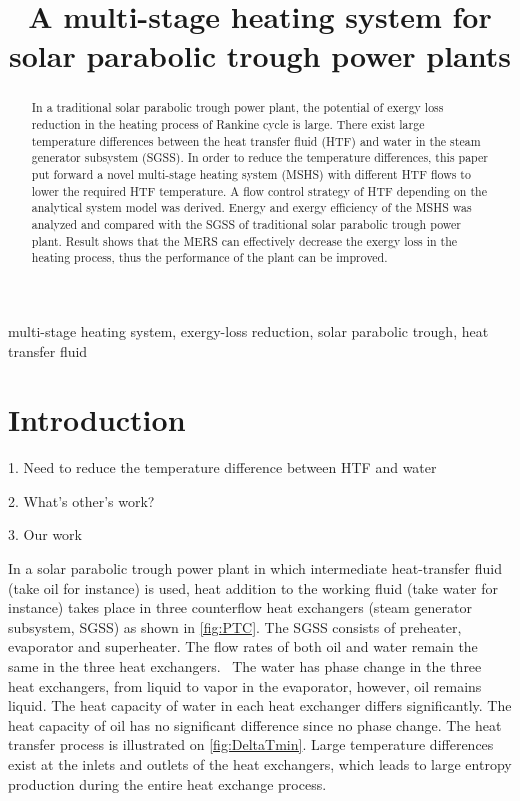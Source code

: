 \documentclass{article}
\begin{document}
\title{A multi-stage heating system for solar parabolic trough power plants}
\date{}
\author{}
\maketitle

\begin{abstract}
In a traditional solar parabolic trough power plant, the potential of exergy loss reduction in the heating process of Rankine cycle is large. There exist large temperature differences between the heat transfer fluid (HTF) and water in the steam generator subsystem (SGSS). In order to reduce the temperature differences, this paper put forward a novel multi-stage heating system (MSHS) with different HTF flows to lower the required HTF temperature. A flow control strategy of HTF depending on the analytical system model was derived. Energy and exergy efficiency of the MSHS was analyzed and compared with the SGSS of traditional solar parabolic trough power plant. Result shows that the MERS can effectively decrease the exergy loss in the heating process, thus the performance of the plant can be improved.
\end{abstract}

multi-stage heating system, exergy-loss reduction, solar parabolic trough, heat transfer fluid
\newpage{}

\linenumbers

\section{Introduction}



1. Need to reduce the temperature difference between HTF and water

2. What's other's work?

3. Our work

In a solar parabolic trough power plant in which intermediate heat-transfer fluid (take oil for instance) is used, heat addition to the working fluid (take water for instance) takes place in three counterflow heat exchangers (steam generator subsystem, SGSS) as shown in \ref{fig:PTC}. The SGSS consists of preheater, evaporator and superheater. The flow rates of both oil and water remain the same in the three heat exchangers.~\cite{Rovira2011}
The water has phase change in the three heat exchangers, from liquid to vapor in the evaporator, however, oil remains liquid. The heat capacity of water in each heat exchanger  differs significantly. The heat capacity of oil has no significant difference since no phase change. The heat transfer process is illustrated on \ref{fig:DeltaTmin}. Large temperature differences exist at the inlets and outlets of the heat exchangers, which leads to large entropy production during the entire heat exchange process.
\end{document}
